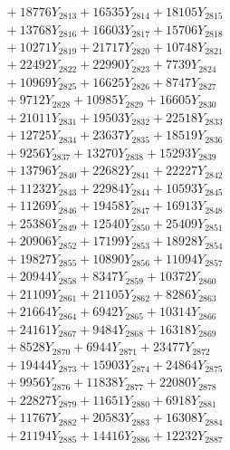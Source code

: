 \documentclass[a4paper,10pt]{article}
\begin{document}
{\begin{align}
&\;  + 18776 Y_{2813} + 16535 Y_{2814} + 18105 Y_{2815} \\[0.3ex]
&\;  + 13768 Y_{2816} + 16603 Y_{2817} + 15706 Y_{2818} \\[0.5ex]\allowbreak
&\;  + 10271 Y_{2819} + 21717 Y_{2820} + 10748 Y_{2821} \\[0.3ex]
&\;  + 22492 Y_{2822} + 22990 Y_{2823} + 7739 Y_{2824} \\[0.3ex]
&\;  + 10969 Y_{2825} + 16625 Y_{2826} + 8747 Y_{2827} \\[0.3ex]
&\;  + 9712 Y_{2828} + 10985 Y_{2829} + 16605 Y_{2830} \\[0.3ex]
&\;  + 21011 Y_{2831} + 19503 Y_{2832} + 22518 Y_{2833} \\[0.3ex]
&\;  + 12725 Y_{2834} + 23637 Y_{2835} + 18519 Y_{2836} \\[0.3ex]
&\;  + 9256 Y_{2837} + 13270 Y_{2838} + 15293 Y_{2839} \\[0.3ex]
&\;  + 13796 Y_{2840} + 22682 Y_{2841} + 22227 Y_{2842} \\[0.3ex]
&\;  + 11232 Y_{2843} + 22984 Y_{2844} + 10593 Y_{2845} \\[0.3ex]
&\;  + 11269 Y_{2846} + 19458 Y_{2847} + 16913 Y_{2848} \\[0.5ex]\allowbreak
&\;  + 25386 Y_{2849} + 12540 Y_{2850} + 25409 Y_{2851} \\[0.3ex]
&\;  + 20906 Y_{2852} + 17199 Y_{2853} + 18928 Y_{2854} \\[0.3ex]
&\;  + 19827 Y_{2855} + 10890 Y_{2856} + 11094 Y_{2857} \\[0.3ex]
&\;  + 20944 Y_{2858} + 8347 Y_{2859} + 10372 Y_{2860} \\[0.3ex]
&\;  + 21109 Y_{2861} + 21105 Y_{2862} + 8286 Y_{2863} \\[0.3ex]
&\;  + 21664 Y_{2864} + 6942 Y_{2865} + 10314 Y_{2866} \\[0.3ex]
&\;  + 24161 Y_{2867} + 9484 Y_{2868} + 16318 Y_{2869} \\[0.3ex]
&\;  + 8528 Y_{2870} + 6944 Y_{2871} + 23477 Y_{2872} \\[0.3ex]
&\;  + 19444 Y_{2873} + 15903 Y_{2874} + 24864 Y_{2875} \\[0.3ex]
&\;  + 9956 Y_{2876} + 11838 Y_{2877} + 22080 Y_{2878} \\[0.5ex]\allowbreak
&\;  + 22827 Y_{2879} + 11651 Y_{2880} + 6918 Y_{2881} \\[0.3ex]
&\;  + 11767 Y_{2882} + 20583 Y_{2883} + 16308 Y_{2884} \\[0.3ex]
&\;  + 21194 Y_{2885} + 14416 Y_{2886} + 12232 Y_{2887} \\[0.3ex]

\end{align}}
\end{document}
